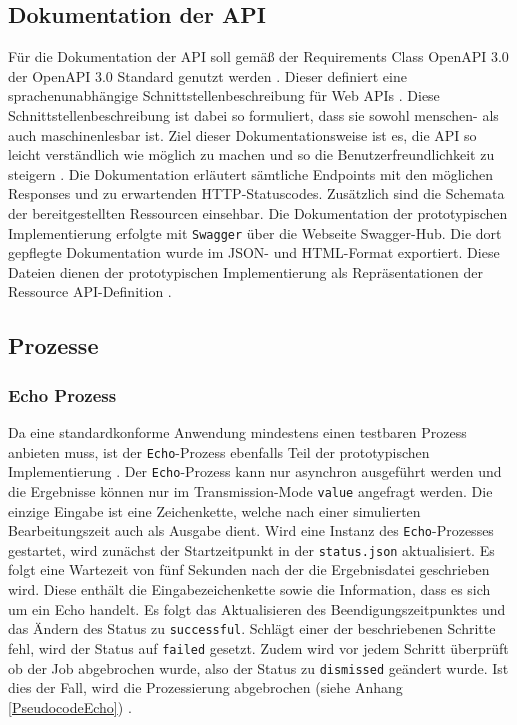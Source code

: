 \subsection{Dokumentation der API}
Für die Dokumentation der API soll gemäß der Requirements Class OpenAPI 3.0 der OpenAPI 3.0 Standard genutzt werden \cite{ogc_api_processes_core}. 
Dieser definiert eine sprachenunabhängige Schnittstellenbeschreibung für Web APIs \cite{open_api}. 
Diese Schnittstellenbeschreibung ist dabei so formuliert, dass sie sowohl menschen- als auch maschinenlesbar ist. 
Ziel dieser Dokumentationsweise ist es, die API so leicht verständlich wie möglich zu machen und so die Benutzerfreundlichkeit zu steigern \cite{open_api}.
Die Dokumentation erläutert sämtliche Endpoints mit den möglichen Responses und zu erwartenden HTTP-Statuscodes. Zusätzlich sind die Schemata der 
bereitgestellten Ressourcen einsehbar.
Die Dokumentation der prototypischen Implementierung erfolgte mit \verb|Swagger| über die Webseite Swagger-Hub. Die dort gepflegte Dokumentation wurde im JSON- und HTML-Format 
exportiert. Diese Dateien dienen der prototypischen Implementierung als Repräsentationen der Ressource API-Definition \cite{code,ogc_api_processes_core}. 

\subsection{Prozesse}
\subsubsection{Echo Prozess}
Da eine standardkonforme Anwendung mindestens einen testbaren Prozess anbieten muss, ist der \verb|Echo|-Prozess 
ebenfalls Teil der prototypischen Implementierung \cite{ogc_api_processes_core}. 
Der \verb|Echo|-Prozess kann nur asynchron ausgeführt werden und die Ergebnisse können nur im Transmission-Mode \verb|value| angefragt werden. Die einzige Eingabe ist eine Zeichenkette,
welche nach einer simulierten Bearbeitungszeit auch als Ausgabe dient.
Wird eine Instanz des \verb|Echo|-Prozesses gestartet, wird zunächst der Startzeitpunkt in der \verb|status.json| aktualisiert. Es folgt eine Wartezeit von fünf Sekunden nach der die 
Ergebnisdatei geschrieben wird. Diese enthält die Eingabezeichenkette sowie die Information, dass es sich um ein Echo handelt. Es folgt das Aktualisieren des 
Beendigungszeitpunktes und das Ändern des Status zu \verb|successful|. Schlägt einer der beschriebenen Schritte fehl, wird der Status auf \verb|failed| gesetzt. 
Zudem wird vor jedem Schritt überprüft ob der Job abgebrochen wurde, also der Status zu \verb|dismissed| geändert wurde. Ist dies der Fall, wird die Prozessierung abgebrochen 
(siehe Anhang \ref{PseudocodeEcho}) \cite{code}. 


